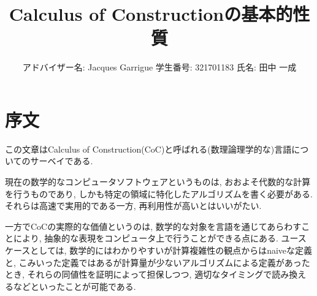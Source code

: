 \documentclass[12pt, titlepage]{ltjsarticle}
\begin{document}
\theoremstyle{definition}
\newtheorem{defn}{定義}
\newtheorem{thm}{定理}
\newtheorem{lem}{補題}
\newtheorem{rem}{注意}
\newtheorem{cor}{系}
\newtheorem{ex}{例}
\renewcommand{\proofname}{\bf{証明}}

\title{Calculus of Constructionの基本的性質}
\author{
アドバイザー名: Jacques Garrigue
学生番号: 321701183
氏名: 田中 一成
}
\maketitle

%
%

\section{序文}
この文章はCalculus of Construction(CoC)と呼ばれる(数理論理学的な)言語についてのサーベイである.

現在の数学的なコンピュータソフトウェアというものは, おおよそ代数的な計算を行うものであり, しかも特定の領域に特化したアルゴリズムを書く必要がある.
それらは高速で実用的である一方, 再利用性が高いとはいいがたい.

一方でCoCの実際的な価値というのは, 数学的な対象を言語を通じてあらわすことにより, 抽象的な表現をコンピュータ上で行うことができる点にある.
ユースケースとしては, 数学的にはわかりやすいが計算複雑性の観点からはnaiveな定義と, こみいった定義ではあるが計算量が少ないアルゴリズムによる定義があったとき,
それらの同値性を証明によって担保しつつ, 適切なタイミングで読み換えるなどといったことが可能である.

\end{document}
